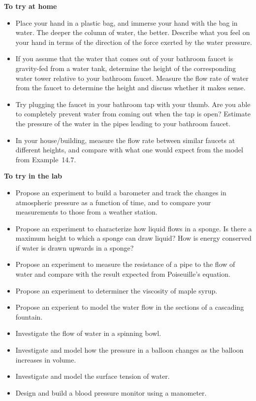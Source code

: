 \begin{framed}
\textbf{To try at home}\\
\begin{itemize}
\item Place your hand in a plastic bag, and immerse your hand with the bag in water. The deeper the column of water, the better. Describe what you feel on your hand in terms of the direction of the force exerted by the water pressure.
\item If you assume that the water that comes out of your bathroom faucet is gravity-fed from a water tank, determine the height of the corresponding water tower relative to your bathroom faucet. Measure the flow rate of water from the faucet to determine the height and discuss whether it makes sense.
\item Try plugging the faucet in your bathroom tap with your thumb. Are you able to completely prevent water from coming out when the tap is open? Estimate the pressure of the water in the pipes leading to your bathroom faucet.
\item In your house/building, measure the flow rate between similar faucets at different heights, and compare with what one would expect from the model from Example~14.7.
\end{itemize}
\end{framed}

\begin{framed}
\textbf{To try in the lab}\\
\begin{itemize}
\item Propose an experiment to build a barometer and track the changes in atmospheric pressure as a function of time, and to compare your measurements to those from a weather station.
\item Propose an experiment to characterize how liquid flows in a sponge. Is there a maximum height to which a sponge can draw liquid? How is energy conserved if water is drawn upwards in a sponge?
\item Propose an experiment to measure the resistance of a pipe to the flow of water and compare with the result expected from Poiseuille's equation.
\item Propose an experiment to determiner the viscosity of maple syrup.
\item Propose an experient to model the water flow in the sections of a cascading fountain.
\item Investigate the flow of water in a spinning bowl.
\item Investigate and model how the pressure in a balloon changes as the balloon increases in volume.
\item Investigate and model the surface tension of water.
\item Design and build a blood pressure monitor using a manometer.
\end{itemize}
\end{framed}

